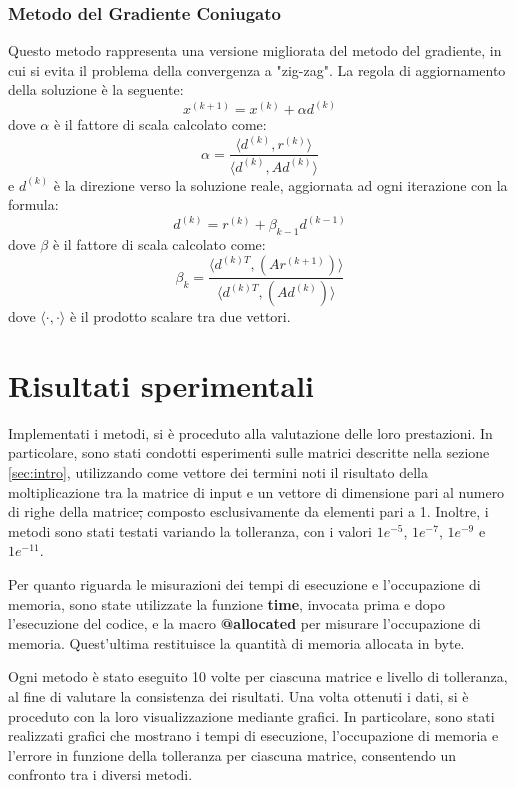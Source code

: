 \subsubsection{Metodo del Gradiente Coniugato}
Questo metodo rappresenta una versione migliorata del metodo del gradiente, in
cui si evita il problema della convergenza a "zig-zag". La regola di aggiornamento
della soluzione è la seguente:
\begin{equation}
    x^{(k+1)} = x^{(k)} + \alpha d^{(k)}
\end{equation}
dove $\alpha$ è il fattore di scala calcolato come:
\begin{equation}
    \alpha = \frac{\langle d^{(k)}, r^{(k)}\rangle}{\langle d^{(k)}, Ad^{(k)}\rangle}
\end{equation}
e $d^{(k)}$ è la direzione verso la soluzione reale, aggiornata ad ogni iterazione
con la formula:
\begin{equation}
    d^{(k)} = r^{(k)} + \beta_{k-1} d^{(k-1)}
\end{equation}
dove $\beta$ è il fattore di scala calcolato come:
\begin{equation}
    \beta_k = \frac{\langle d^{(k)T}, (Ar^{(k + 1)})\rangle}{\langle d^{(k)T}, (Ad^{(k)})\rangle}
\end{equation}
dove $\langle \cdot, \cdot \rangle$ è il prodotto scalare tra due vettori.

\section{Risultati sperimentali}
Implementati i metodi, si è proceduto alla valutazione delle loro prestazioni.
In particolare, sono stati condotti esperimenti sulle matrici descritte nella
sezione \ref{sec:intro}, utilizzando come vettore dei termini noti il risultato
della moltiplicazione tra la matrice di input e un vettore di dimensione pari al
numero di righe della matrice\st{,} composto esclusivamente da elementi pari a 1.
Inoltre, i metodi sono stati testati variando la tolleranza, con i valori $1e^{-5}$,
$1e^{-7}$, $1e^{-9}$ e $1e^{-11}$.

Per quanto riguarda le misurazioni dei tempi di esecuzione e l'occupazione di
memoria, sono state utilizzate la funzione \textbf{time}, invocata prima e dopo
l'esecuzione del codice, e la macro \textbf{@allocated} per misurare l'occupazione
di memoria. Quest'ultima restituisce la quantità di memoria allocata in byte.

Ogni metodo è stato eseguito 10 volte per ciascuna matrice e livello di tolleranza,
al fine di valutare la consistenza dei risultati. Una volta ottenuti i dati, si è
proceduto con la loro visualizzazione mediante grafici. In particolare, sono stati
realizzati grafici che mostrano i tempi di esecuzione, l'occupazione di memoria
e l'errore in funzione della tolleranza per ciascuna matrice, consentendo un confronto tra
i diversi metodi.

